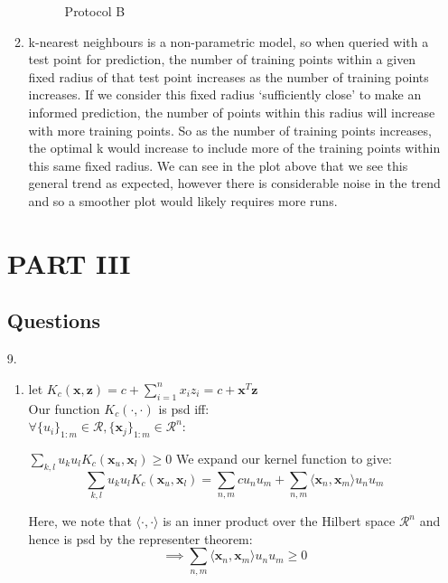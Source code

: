 \documentclass[12pt]{article}
\begin{document}
\begin{enumerate}[leftmargin=\labelsep]
\begin{enumerate}
\begin{figure}[h]
            \caption{Protocol B}
            \label{fig:8}
            \end{figure}
        \item k-nearest neighbours is a non-parametric model, so when queried with a test point for prediction, the number of training points within a given fixed radius of that test point increases as the number of training points increases.
        If we consider this fixed radius `sufficiently close' to make an informed prediction, the number of points within this radius will increase with more training points.
        So as the number of training points increases, the optimal k would increase to include more of the training points within this same fixed radius.
        We can see in the plot above that we see this general trend as expected, however there is considerable noise in the trend and so a smoother plot would likely requires more runs.
    \end{enumerate}
\newpage
\section{PART III}
\subsection{Questions}
\item[9.] \begin{enumerate}
              \item let $K_{c}(\textbf{x},\textbf{z}) = c+ \sum_{i=1}^{n}x_{i}z_{i} = c + \textbf{x}^{T}\textbf{z}$\\
        Our function $K_{c}(\cdot, \cdot)$ is psd iff:\\
        $\forall \{ u_{i} \}_{1:m} \in \mathcal{R},
         \{ \textbf{x}_{j}\}_{1:m} \in \mathcal{R}^{n}$:

        $\sum_{k,l} u_{k}u_{l}K_{c}(\textbf{x}_{u},\textbf{x}_{l}) \ge 0$
        We expand our kernel function to give: \\

        \[\sum_{k,l} u_{k}u_{l}K_{c}(\textbf{x}_{u},\textbf{x}_{l}) =  \sum_{n,m} cu_{n} u_{m} + \sum_{n,m} \langle\textbf{x}_{n}, \textbf{x}_{m}\rangle u_{n} u_{m}\]

        Here, we note that $\langle \cdot, \cdot \rangle$ is an inner product over the Hilbert space $\mathcal{R}^{n}$ and hence is psd by the representer theorem:
                \begin{equation}
        \implies \sum_{n,m} \langle\textbf{x}_{n},
        \textbf{x}_{m}\rangle u_{n} u_{m} \ge 0
                \end{equation}


\end{enumerate}
\end{enumerate}
\end{document}
